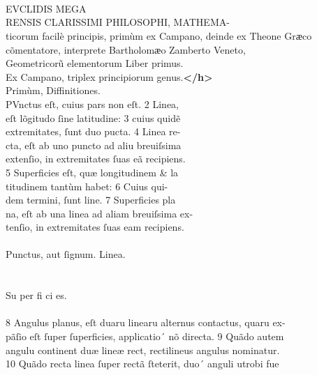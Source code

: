 \begin{typeLatin}
 \\
 \\
 \\
EVCLIDIS MEGA \\
RENSIS CLARISSIMI PHILOSOPHI, MATHEMA- \\
ticorum facilè principis, primùm ex Campano, deinde ex Theone Grӕco \\
cõmentatore, interprete Bartholomӕo Zamberto Veneto, \\
Geometricorũ elementorum Liber primus. \\
Ex Campano, triplex principiorum genus.\textbf{</h>} \\
Primùm, Diffinitiones. \\
PVnctus eſt, cuius pars non eſt. 2 Linea, \\
eſt lõgitudo ſine latitudine: 3 cuius quidẽ \\
extremitates, ſunt duo p\bs\tld{}ucta. 4 Linea re-\\
cta, eſt ab uno puncto ad ali\bs\tld{}u breuiſsima\\
extenſio, in extremitates ſuas eã recipiens.\\
5 Superficies eſt, quæ longitudinem & la\\
titudinem tantùm habet: 6 Cuius qui-\\
dem termini, ſunt line. 7 Superficies pla\\
na, eſt ab una linea ad aliam breuiſsima ex-\\
tenſio, in extremitates ſuas eam recipiens.\\
\\
\bold{_}P\bold{_}unctus, aut ſignum. \bold{_}L\bold{_}inea.\\
\\
\\
Su per fi ci es.\\
\\
8 Angulus planus, eſt duar\bs\tld{}u linear\bs\tld{}u alternus contactus, quar\bs\tld{}u ex-\\
pãſio eſt ſuper ſuperficies, applicatio´ nõ directa. 9 Quãdo autem\\
angul\bs\tld{}u continent duæ lineæ rect, rectilineus angulus nominatur.\\
10 Quãdo recta linea ſuper rectã ſteterit, duo´ anguli utrobi fue\\

\end{typeLatin}
